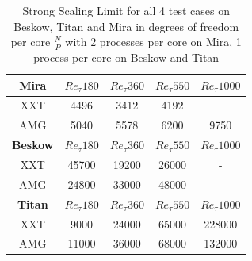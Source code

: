 \documentclass{sig-alternate}
\begin{document}
\begin{table}  
  \caption{Strong Scaling Limit for all 4 test cases on Beskow, Titan and Mira
  in degrees of freedom per core $\frac{N}{P}$ with 2 processes per core on Mira, 1 process per core on Beskow and Titan}
  \centering
  \begin{tabular}{c||cccc}
    \hline
    \hline
    {\bf Mira}
    &$Re_{\tau} 180$&$Re_{\tau} 360$&$Re_{\tau} 550$&$Re_{\tau} 1000$\\
    \hline
    XXT&4496&3412&4192&\\
    AMG&5040&5578&6200&9750\\
    \hline
    \hline
    {\bf Beskow}
    &$Re_{\tau} 180$&$Re_{\tau} 360$&$Re_{\tau} 550$&$Re_{\tau} 1000$\\
    \hline
    XXT&45700&19200&26000& - \\
    AMG&24800&33000&48000& - \\
    \hline
    \hline
    {\bf Titan}
    &$Re_{\tau} 180$&$Re_{\tau} 360$&$Re_{\tau} 550$&$Re_{\tau} 1000$\\
    \hline
    XXT&9000&24000&65000&228000\\
    AMG&11000&36000&68000&132000\\
    \hline
    \hline
  \end{tabular}
  \label{tab:stronglimit}
\end{table}

% 
\end{document}
